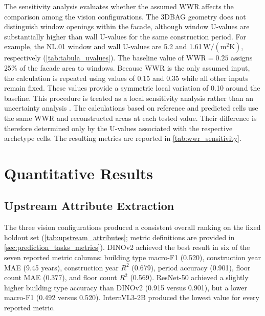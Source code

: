 The sensitivity analysis evaluates whether the assumed WWR affects the comparison among the vision configurations.
The 3DBAG geometry does not distinguish window openings within the facade, although window U-values are substantially higher than wall U-values for the same construction period.
For example, the NL.01 window and wall U-values are 5.2 and 1.61\,$\mathrm{W/(m^2K)}$, respectively (\cref{tab:tabula_uvalues}).
The baseline value of $\mathrm{WWR} = 0.25$ assigns 25\% of the facade area to windows.
Because WWR is the only assumed input, the calculation is repeated using values of 0.15 and 0.35 while all other inputs remain fixed.
These values provide a symmetric local variation of 0.10 around the baseline.
This procedure is treated as a local sensitivity analysis rather than an uncertainty analysis \parencite{pang2020}.
The calculations based on reference and predicted cells use the same WWR and reconstructed areas at each tested value.
Their difference is therefore determined only by the U-values associated with the respective archetype cells.
The resulting metrics are reported in \cref{tab:wwr_sensitivity}.

\section{Quantitative Results}
\label{sec:quantitative_results}

\subsection{Upstream Attribute Extraction}
\label{sec:upstream_attribute_extraction}

The three vision configurations produced a consistent overall ranking on the fixed holdout set (\cref{tab:upstream_attributes}; metric definitions are provided in \cref{sec:prediction_tasks_metrics}).
DINOv2 achieved the best result in six of the seven reported metric columns: building type macro-F1 (0.520), construction year MAE (9.45 years), construction year $R^2$ (0.679), period accuracy (0.901), floor count MAE (0.377), and floor count $R^2$ (0.569).
ResNet-50 achieved a slightly higher building type accuracy than DINOv2 (0.915 versus 0.901), but a lower macro-F1 (0.492 versus 0.520).
InternVL3-2B produced the lowest value for every reported metric.

